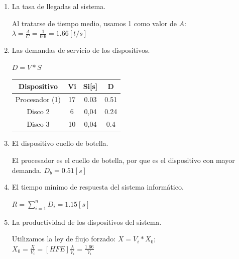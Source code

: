 \begin{enumerate}
    \item La tasa de llegadas al sistema.
    \begin{tcolorbox}[colback=white,colframe=cyan!50!black,fonttitle=\bfseries]
    Al tratarse de tiempo medio, usamos 1 como valor de $A$:\\
    $\lambda = \frac{A}{C} = \frac{1}{0.6} = 1.66[t/s]$
    \end{tcolorbox}
    \item Las demandas de servicio de los dispositivos.
    \begin{tcolorbox}[colback=white,colframe=cyan!50!black,fonttitle=\bfseries]
    $D=V*S$
    \begin{table}[H]\centering\begin{tabular}{|c|c|c|c|}\hline
    \textbf{Dispositivo}    & \textbf{Vi} & \textbf{Si[s]} & \textbf{D}\\ \hline
    Procesador (1) & 17 & 0.03 & 0.51   \\ \hline
    Disco 2        & 6  & 0,04 & 0.24  \\ \hline
    Disco 3        & 10 & 0,04 & 0.4   \\ \hline
    \end{tabular}\end{table}
    \end{tcolorbox}
    \item El dispositivo cuello de botella.
    \begin{tcolorbox}[colback=white,colframe=cyan!50!black,fonttitle=\bfseries]
    El procesador es el cuello de botella, por que es el dispositivo con mayor demanda.
    $D_b = 0.51[s]$
    \end{tcolorbox}
    \item El tiempo mínimo de respuesta del sistema informático.
    \begin{tcolorbox}[colback=white,colframe=cyan!50!black,fonttitle=\bfseries]
    $R=\sum_{i=1}^{n}D_i=1.15[s]$
    \end{tcolorbox}
    \item La productividad de los dispositivos del sistema.
    \begin{tcolorbox}[colback=white,colframe=cyan!50!black,fonttitle=\bfseries]
    Utilizamos la ley de flujo forzado: $X = V_i * X_0$; \\
    $X_0 = \frac{X}{V_i}=[HFE]\frac{\lambda}{V_i}=\frac{1.66}{V_i}$
    \begin{table}[H]\centering\begin{tabular}{|c|c|c|c|c|}\hline

\end{tabular}
\end{table}
\end{tcolorbox}
\end{enumerate}
